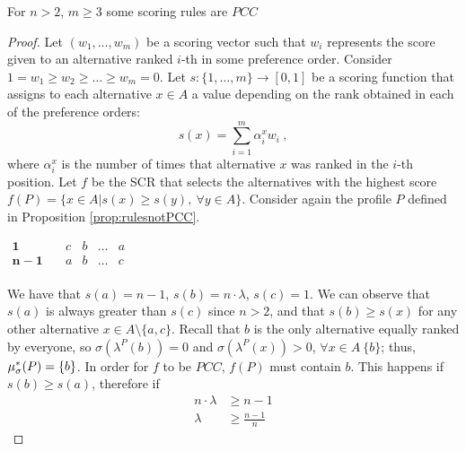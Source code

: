 \documentclass[version=3.21, pagesize, twoside=off, bibliography=totoc, DIV=calc, fontsize=12pt, a4paper]{scrartcl}
\begin{document}
\begin{proposition}
	For $n>2$, $m\geq3$ some scoring rules are  $PCC$ 
\end{proposition}
\begin{proof}
	Let $(w_1, \dots, w_m)$ be a scoring vector such that $w_i$ represents the score given to an alternative ranked $i$-th in some preference order. Consider $1 = w_1 \geq w_2 \geq \dots \geq w_{m} = 0$. Let $s:\{1,\dots,m\}\rightarrow [0,1]$ be a scoring function that assigns to each alternative $x \in A$ a value depending on the rank obtained in each of the preference orders: 
	\[ s(x) = \sum_{i=1}^{m} \alpha^{x}_i w_i \ ,\]
	where $\alpha^{x}_i$ is the number of times that alternative $x$ was ranked in the $i$-th position. Let $f$ be the SCR that selects the alternatives with the highest score $f(P)=\{x \in A | s(x)\geq s(y), \ \forall y \in A\}$.
	Consider again the profile $P$ defined in Proposition \ref{prop:rulesnotPCC}.
	\begin{center}
		$
		\begin{array}{ccccc}
		\mathbf{1} \quad &c&b&\dots &a\\
		\mathbf{n-1} \quad &a&b&\dots &c\\		
		\end{array}
		$
	\end{center}
	We have that $s(a)=n-1$, $s(b)=n\cdot \lambda$, $s(c)=1$. We can observe that $s(a)$ is always greater than $s(c)$ since $n>2$, and that $s(b)\geq s(x)$ for any other alternative $x\in A \setminus \{a,c\}$. Recall that $b$ is the only alternative equally ranked by everyone, so $\sigma(\lambda^P(b))=0$ and $\sigma(\lambda^P(x))>0$, $\forall x \in A \ \{b\}$; thus, $\mu_{\sigma}^*(P)=\{b\}$. In order for $f$ to be $PCC$, $f(P)$ must contain $b$. This happens if $s(b)\geq s(a)$, therefore if 
	\begin{align}
	n\cdot\lambda &\geq n-1 \\
	\lambda &\geq \frac{n-1}{n} 
	\end{align}
\end{proof}
\end{document}
